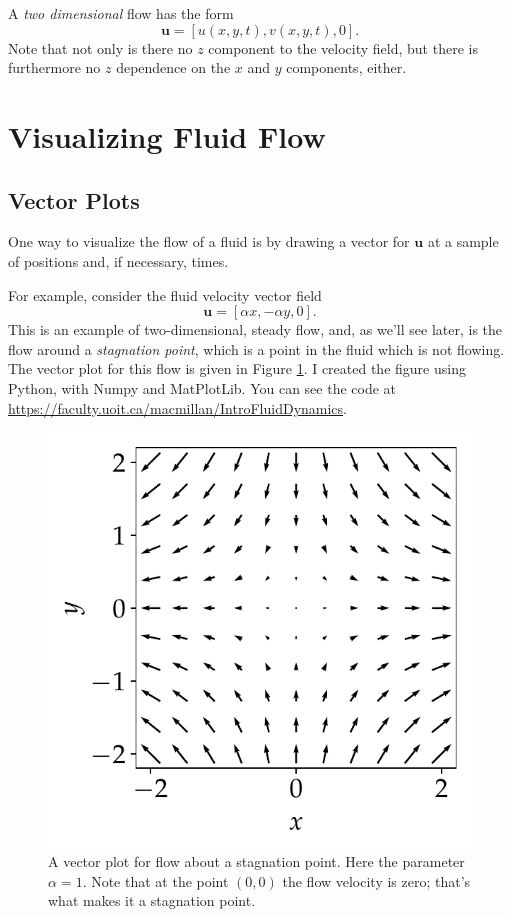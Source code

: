 \begin{example}
A \emph{two dimensional} flow has the form
\begin{equation}
\mathbf{u} = [u(x, y, t), v(x, y, t), 0].
\end{equation}
Note that not only is there no $z$ component to the velocity field, but there is furthermore no $z$ dependence on the
$x$ and $y$ components, either.
\end{example}





\section{Visualizing Fluid Flow}



\subsection{Vector Plots}

One way to visualize the flow of a fluid is by drawing a vector for $\mathbf{u}$ at a sample of positions and, if necessary, times.

\begin{example}
For example, consider the fluid velocity vector field
\begin{equation}
\label{eq_stag}
\mathbf{u} = [\alpha x, -\alpha y, 0].
\end{equation}
This is an example of two-dimensional, steady flow, and, as we'll see later, is the flow around a \emph{stagnation point}, which is a point in the fluid which is not flowing.  The vector plot for this flow is given in Figure \ref{fig_vector_plot}.  I created the figure using Python, with Numpy and MatPlotLib.  You can see the code at \url{https://faculty.uoit.ca/macmillan/IntroFluidDynamics}.
\end{example}

\begin{figure}
\centering\includegraphics[width=0.5\linewidth]{Figures/Chapter1/fig_vector_plot}
\caption{A vector plot for flow about a stagnation point.  Here the parameter $\alpha = 1$.  Note that at the point $(0,0)$ the flow velocity is zero; that's what makes it a stagnation point.}
\label{fig_vector_plot}
\end{figure}



